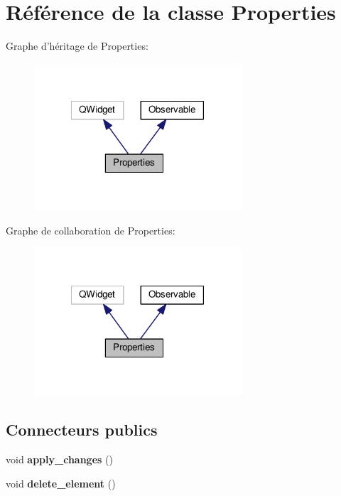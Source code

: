 \hypertarget{classProperties}{\section{Référence de la classe Properties}
\label{classProperties}
}


Graphe d'héritage de Properties\+:
\nopagebreak
\begin{figure}[H]
\begin{center}
\leavevmode
\includegraphics[width=219pt]{de/d7f/classProperties__inherit__graph}
\end{center}
\end{figure}


Graphe de collaboration de Properties\+:
\nopagebreak
\begin{figure}[H]
\begin{center}
\leavevmode
\includegraphics[width=219pt]{dc/d0a/classProperties__coll__graph}
\end{center}
\end{figure}
\subsection*{Connecteurs publics}
\begin{DoxyCompactItemize}
\item 
\hypertarget{classProperties_aa8e9e5c83983a60486d963d2e5b97bf9}{void {\bfseries apply\+\_\+changes} ()}\label{classProperties_aa8e9e5c83983a60486d963d2e5b97bf9}

\item 
\hypertarget{classProperties_acb83b3e38f6bbe0cd57d0cf123460253}{void {\bfseries delete\+\_\+element} ()}\label{classProperties_acb83b3e38f6bbe0cd57d0cf123460253}

\end{DoxyCompactItemize}
